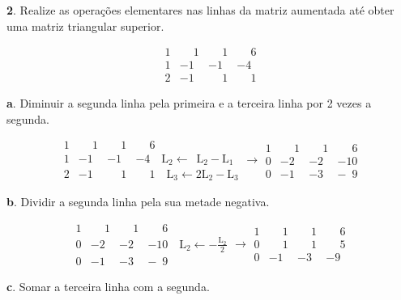\documentclass[12pt]{article}
\begin{document}
\textbf{2}. Realize as operações elementares nas linhas da matriz aumentada até obter uma matriz triangular superior.

\[
\begin{array}{rrr|l}
    1  &  \phantom{-}1  &  \phantom{-}1  &  \phantom{-}6 \\
    1  &            -1  &            -1  &            -4 \\
    2  &            -1  &  \phantom{-}1  &  \phantom{-}1
\end{array}
\]

\textbf{a}. Diminuir a segunda linha pela primeira e a terceira linha por 2 vezes a segunda.

\[
\begin{array}{rrr|l}
    1 & \phantom{-}1 & \phantom{-}1 & \phantom{-}6 \\
    1 &           -1 &           -1 &           -4 \quad \text{L}_2 \leftarrow \phantom{2}\text{L}_2 - \text{L}_1 \\
    2 &           -1 & \phantom{-}1 & \phantom{-}1 \quad \text{L}_3 \leftarrow 2\text{L}_2 - \text{L}_3
\end{array}
\rightarrow
\begin{array}{rrr|l}
    1  &  \phantom{-}1  &  \phantom{-}1  &  \phantom{-1}6 \\
    0  &            -2  &            -2  &            -10 \\
    0  &            -1  &            -3  &  -\phantom{1}9
\end{array}
\]

\textbf{b}. Dividir a segunda linha pela sua metade negativa.

\[
    \begin{array}{rrr|l}
        1  &  \phantom{-}1  &  \phantom{-}1  &  \phantom{-1}6 \\
        0  &            -2  &            -2  &            -10 \quad \text{L}_2 \leftarrow -\frac{\text{L}_2}{2} \\
        0  &            -1  &            -3  &  -\phantom{1}9
    \end{array}
\rightarrow
\begin{array}{rrr|l}
    1  &  \phantom{-}1  &  \phantom{-}1  &  \phantom{-}6 \\
    0  &  \phantom{-}1  &  \phantom{-}1  &  \phantom{-}5 \\
    0  &            -1  &            -3  &            -9
\end{array}
\]

\textbf{c}. Somar a terceira linha com a segunda.
\end{document}
